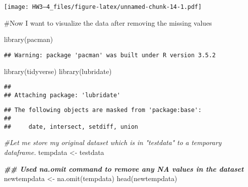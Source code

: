 \documentclass[
]{article}
\newenvironment{Shaded}{\begin{snugshade}}{\end{snugshade}}
\newcommand{\CommentTok}[1]{\textcolor[rgb]{0.56,0.35,0.01}{\textit{#1}}}
\newcommand{\DocumentationTok}[1]{\textcolor[rgb]{0.56,0.35,0.01}{\textbf{\textit{#1}}}}
\newcommand{\FunctionTok}[1]{\textcolor[rgb]{0.00,0.00,0.00}{#1}}
\newcommand{\NormalTok}[1]{#1}
\newcommand{\OtherTok}[1]{\textcolor[rgb]{0.56,0.35,0.01}{#1}}
\begin{document}
\texttt{[image: HW3---4\_files/figure-latex/unnamed-chunk-14-1.pdf]}

\#Now I want to visualize the data after removing the missing values

\begin{Shaded}
\begin{Highlighting}[]
\FunctionTok{library}\NormalTok{(pacman)}
\end{Highlighting}
\end{Shaded}

\begin{verbatim}
## Warning: package 'pacman' was built under R version 3.5.2
\end{verbatim}

\begin{Shaded}
\begin{Highlighting}[]
\FunctionTok{library}\NormalTok{(tidyverse)}
\FunctionTok{library}\NormalTok{(lubridate)}
\end{Highlighting}
\end{Shaded}

\begin{verbatim}
## 
## Attaching package: 'lubridate'
\end{verbatim}

\begin{verbatim}
## The following objects are masked from 'package:base':
## 
##     date, intersect, setdiff, union
\end{verbatim}

\begin{Shaded}
\begin{Highlighting}[]
\CommentTok{\#Let me store my original dataset which is in "testdata" to a temporary dataframe.}
\NormalTok{tempdata }\OtherTok{\textless{}{-}}\NormalTok{ testdata}

\DocumentationTok{\#\# Used na.omit command to remove any NA values in the dataset }
\NormalTok{newtempdata }\OtherTok{\textless{}{-}} \FunctionTok{na.omit}\NormalTok{(tempdata)}
\FunctionTok{head}\NormalTok{(newtempdata)}
\end{Highlighting}
\end{Shaded}
\end{document}
